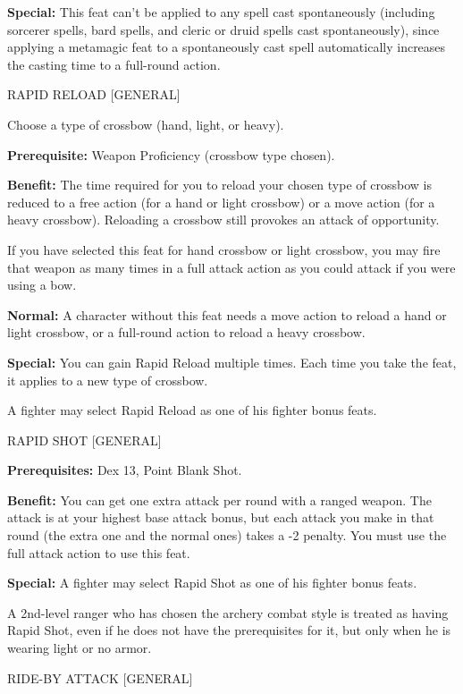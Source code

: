 \documentclass{article}
\begin{document}
\textbf{Special:} This feat can't be applied to any spell cast spontaneously (including 
sorcerer spells, bard spells, and cleric or druid spells cast spontaneously), since 
applying a metamagic feat to a spontaneously cast spell automatically increases 
the casting time to a full-round action.

\vspace{12pt}
RAPID RELOAD [GENERAL]

Choose a type of crossbow (hand, light, or heavy).

\textbf{Prerequisite:} Weapon Proficiency (crossbow type chosen).

\textbf{Benefit:} The time required for you to reload your chosen type of crossbow 
is reduced to a free action (for a hand or light crossbow) or a move action (for 
a heavy crossbow). Reloading a crossbow still provokes an attack of opportunity.

If you have selected this feat for hand crossbow or light crossbow, you may fire 
that weapon as many times in a full attack action as you could attack if you were 
using a bow.

\textbf{Normal:} A character without this feat needs a move action to reload a 
hand or light crossbow, or a full-round action to reload a heavy crossbow. 

\textbf{Special:} You can gain Rapid Reload multiple times. Each time you take 
the feat, it applies to a new type of crossbow.

A fighter may select Rapid Reload as one of his fighter bonus feats.

\vspace{12pt}
RAPID SHOT [GENERAL]

\textbf{Prerequisites:} Dex 13, Point Blank Shot.

\textbf{Benefit:} You can get one extra attack per round with a ranged weapon. 
The attack is at your highest base attack bonus, but each attack you make in that 
round (the extra one and the normal ones) takes a -2 penalty. You must use the 
full attack action to use this feat.

\textbf{Special:} A fighter may select Rapid Shot as one of his fighter bonus feats.

A 2nd-level ranger who has chosen the archery combat style is treated as having 
Rapid Shot, even if he does not have the prerequisites for it, but only when he 
is wearing light or no armor.

\vspace{12pt}
RIDE-BY ATTACK [GENERAL]
\end{document}
